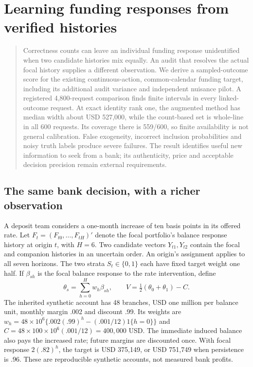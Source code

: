 \chapter{Learning funding responses from verified histories}
\label{integrated:linked_funding}

\begin{quote}\small
Correctness counts can leave an individual funding response unidentified when
two candidate histories mix equally. An audit that resolves the actual focal
history supplies a different observation. We derive a sampled-outcome score
for the existing continuous-action, common-calendar funding target, including
its additional audit variance and independent nuisance pilot. A registered
4,800-request comparison finds finite intervals in every linked-outcome
request. At exact identity rank one, the augmented method has median width
about USD 527,000, while the count-based set is whole-line in all 600 requests.
Its coverage there is 559/600, so finite availability is not general
calibration. False exogeneity, incorrect inclusion probabilities and noisy
truth labels produce severe failures. The result identifies useful new
information to seek from a bank; its authenticity, price and acceptable
decision precision remain external requirements.
\end{quote}

\section{The same bank decision, with a richer observation}

A deposit team considers a one-month increase of ten basis points in its
offered rate. Let $F_t=(F_{t0},\ldots,F_{tH})'$ denote the focal portfolio's
balance response history at origin $t$, with $H=6$. Two candidate vectors
$Y_{t1},Y_{t2}$ contain the focal and companion histories in an uncertain
order. An origin's assignment applies to all seven horizons. The two strata
$S_t\in\{0,1\}$ each have fixed target weight one half. If $\beta_{sh}$ is
the focal balance response to the rate intervention, define
\begin{equation}
 \theta_s=\sum_{h=0}^{H}w_h\beta_{sh},\qquad
 V=\tfrac12(\theta_0+\theta_1)-C.\label{integrated:linked_funding:eq:value}
\end{equation}
The inherited synthetic account has 48 branches, USD one million per balance
unit, monthly margin .002 and discount .99. Its weights are
$w_h=48\times10^6\{.002(.99)^h-(.001/12)1\{h=0\}\}$ and
$C=48\times100\times10^6(.001/12)=400{,}000$ USD. The immediate induced
balance also pays the increased rate; future margins are discounted once.
With focal response $2(.82)^h$, the target is USD 375,149, or USD 751,749
when persistence is .96. These are reproducible synthetic accounts, not
measured bank profits.

